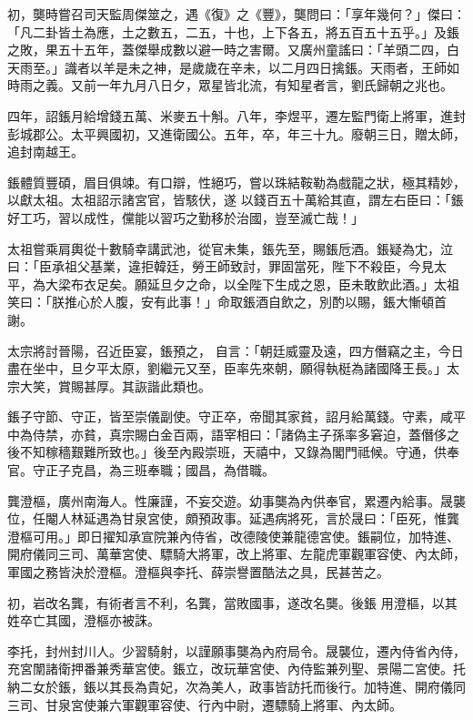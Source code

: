 \begin{pinyinscope}
 初，龑時嘗召司天監周傑筮之，遇《復》之《豐》，龑問曰：「享年幾何？」傑曰：「凡二卦皆土為應，土之數五，二五，十也，上下各五，將五百五十五乎。」及鋹之敗，果五十五年，蓋傑舉成數以避一時之害爾。又廣州童謠曰：「羊頭二四，白
 天雨至。」識者以羊是未之神，是歲歲在辛未，以二月四日擒鋹。天雨者，王師如時雨之義。又前一年九月八日夕，眾星皆北流，有知星者言，劉氏歸朝之兆也。



 四年，詔鋹月給增錢五萬、米麥五十斛。八年，李煜平，遷左監門衛上將軍，進封彭城郡公。太平興國初，又進衛國公。五年，卒，年三十九。廢朝三日，贈太師，追封南越王。



 鋹體質豐碩，眉目俱竦。有口辯，性絕巧，嘗以珠結鞍勒為戲龍之狀，極其精妙，以獻太祖。太祖詔示諸宮官，皆駭伏，遂
 以錢百五十萬給其直，謂左右臣曰：「鋹好工巧，習以成性，儻能以習巧之勤移於治國，豈至滅亡哉！」



 太祖嘗乘肩輿從十數騎幸講武池，從官未集，鋹先至，賜鋹卮酒。鋹疑為冘，泣曰：「臣承祖父基業，違拒韓廷，勞王師致討，罪固當死，陛下不殺臣，今見太平，為大梁布衣足矣。願延旦夕之命，以全陛下生成之恩，臣未敢飲此酒。」太祖笑曰：「朕推心於人腹，安有此事！」命取鋹酒自飲之，別酌以賜，鋹大慚頓首謝。



 太宗將討晉陽，召近臣宴，鋹預之，
 自言：「朝廷威靈及遠，四方僭竊之主，今日盡在坐中，旦夕平太原，劉繼元又至，臣率先來朝，願得執梃為諸國降王長。」太宗大笑，賞賜甚厚。其詼諧此類也。



 鋹子守節、守正，皆至崇儀副使。守正卒，帝聞其家貧，詔月給萬錢。守素，咸平中為侍禁，亦貧，真宗賜白金百兩，語宰相曰：「諸偽主子孫率多窘迫，蓋僭侈之後不知稼穡艱難所致也。」後至內殿崇班，天禧中，又錄為閣門祗候。守通，供奉官。守正子克昌，為三班奉職；國昌，為借職。



 龔澄樞，廣州南海人。性廉謹，不妄交遊。幼事龑為內供奉官，累遷內給事。晟襲位，任閹人林延遇為甘泉宮使，頗預政事。延遇病將死，言於晟曰：「臣死，惟龔澄樞可用。」即日擢知承宣院兼內侍省，改德陵使兼龍德宮使。鋹嗣位，加特進、開府儀同三司、萬華宮使、驃騎大將軍，改上將軍、左龍虎軍觀軍容使、內太師，軍國之務皆決於澄樞。澄樞與李托、薛崇譽置酷法之具，民甚苦之。



 初，岩改名龔，有術者言不利，名龔，當敗國事，遂改名龑。後鋹
 用澄樞，以其姓卒亡其國，澄樞亦被誅。



 李托，封州封川人。少習騎射，以謹願事龑為內府局令。晟襲位，遷內侍省內侍，充宮闈諸衛押番兼秀華宮使。鋹立，改玩華宮使、內侍監兼列聖、景陽二宮使。托納二女於鋹，鋹以其長為貴妃，次為美人，政事皆訪托而後行。加特進、開府儀同三司、甘泉宮使兼六軍觀軍容使、行內中尉，遷驃騎上將軍、內太師。




\end{pinyinscope}
